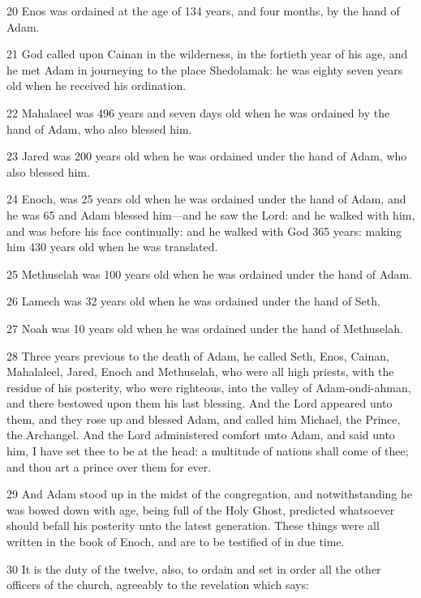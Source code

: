 				20 Enos was ordained at the age of 134 years, and four months, by the hand of Adam.

				21 God called upon Cainan in the wilderness, in the fortieth year of his age, and he met Adam in journeying to the place Shedolamak: he was eighty seven years old when he received his ordination.

				22 Mahalaeel was 496 years and seven days old when he was ordained by the hand of Adam, who also blessed him.

				23 Jared was 200 years old when he was ordained under the hand of Adam, who also blessed him.

				24 Enoch, was 25 years old when he was ordained under the hand of Adam, and he was 65 and Adam blessed him---and he saw the Lord: and he walked with him, and was before his face continually: and he walked with God 365 years: making him 430 years old when he was translated.

				25 Methuselah was 100 years old when he was ordained under the hand of Adam.

				26 Lamech was 32 years old when he was ordained under the hand of Seth.

				27 Noah was 10 years old when he was ordained under the hand of Methuselah.

				28 Three years previous to the death of Adam, he called Seth, Enos, Cainan, Mahalaleel, Jared, Enoch and Methuselah, who were all high priests, with the residue of his posterity, who were righteous, into the valley of Adam-ondi-ahman, and there bestowed upon them his last blessing. And the Lord appeared unto them, and they rose up and blessed Adam, and called him Michael, the Prince, the Archangel. And the Lord administered comfort unto Adam, and said unto him, I have set thee to be at the head: a multitude of nations shall come of thee; and thou art a prince over them for ever.

				29 And Adam stood up in the midst of the congregation, and notwithstanding he was bowed down with age, being full of the Holy Ghost, predicted whatsoever should befall his posterity unto the latest generation. These things were all written in the book of Enoch, and are to be testified of in due time.

				30 It is the duty of the twelve, also, to ordain and set in order all the other officers of the church, agreeably to the revelation which says:


